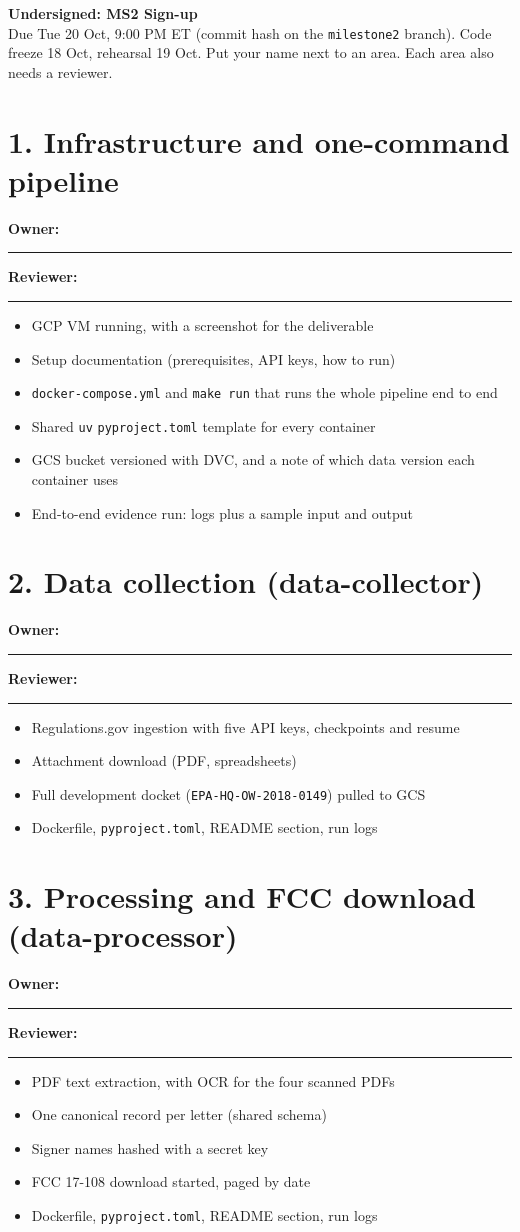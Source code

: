 \documentclass[10pt]{article}
\newcommand{\owner}{\textbf{Owner:} \rule{4cm}{0.4pt}\quad \textbf{Reviewer:} \rule{4cm}{0.4pt}}
\begin{document}
{\sffamily\bfseries\color{ink}\LARGE Undersigned: MS2 Sign-up}\\[2pt]
Due Tue 20 Oct, 9:00 PM ET (commit hash on the \texttt{milestone2} branch). Code freeze 18 Oct, rehearsal 19 Oct.
Put your name next to an area. Each area also needs a reviewer.

\section{1. Infrastructure and one-command pipeline}
\owner 
\begin{itemize}
  \item GCP VM running, with a screenshot for the deliverable
  \item Setup documentation (prerequisites, API keys, how to run)
  \item \texttt{docker-compose.yml} and \texttt{make run} that runs the whole pipeline end to end
  \item Shared \texttt{uv} \texttt{pyproject.toml} template for every container
  \item GCS bucket versioned with DVC, and a note of which data version each container uses
  \item End-to-end evidence run: logs plus a sample input and output
\end{itemize}

\section{2. Data collection (data-collector)}
\owner
\begin{itemize}
  \item Regulations.gov ingestion with five API keys, checkpoints and resume
  \item Attachment download (PDF, spreadsheets)
  \item Full development docket (\texttt{EPA-HQ-OW-2018-0149}) pulled to GCS
  \item Dockerfile, \texttt{pyproject.toml}, README section, run logs
\end{itemize}

\section{3. Processing and FCC download (data-processor)}
\owner
\begin{itemize}
  \item PDF text extraction, with OCR for the four scanned PDFs
  \item One canonical record per letter (shared schema)
  \item Signer names hashed with a secret key
  \item FCC 17-108 download started, paged by date
  \item Dockerfile, \texttt{pyproject.toml}, README section, run logs
\end{itemize}
\end{document}
